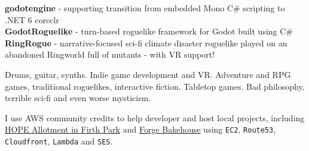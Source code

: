 \documentclass[9pt]{developercv} %
\begin{document}

\begin{minipage}[t]{0.4\textwidth}
	\vspace{-\baselineskip} %

	
	\textbf{godotengine} - supporting transition from embedded Mono C\# scripting to .NET 6 coreclr\\
	\textbf{GodotRoguelike} - turn-based roguelike framework for Godot built using C\#\\
	\textbf{RingRogue} - narrative-focused sci-fi climate disaster roguelike played on an abandoned Ringworld full of mutants - with VR support!\\

\end{minipage}
\hfill
\begin{minipage}[t]{0.25\textwidth}
	\vspace{-\baselineskip} %
	
	
	Drums, guitar, synths. Indie game development and VR. Adventure and RPG games, traditional roguelikes, interactive fiction. Tabletop games. Bad philosophy, terrible sci-fi and even worse mysticism.
\end{minipage}
\hfill
\begin{minipage}[t]{0.25\textwidth}
	\vspace{-\baselineskip} %
	
	
	I use AWS community credits to help developer and host local projects, including \href{https://hopeallotment.org.uk/}{HOPE Allotment in Firth Park} and \href{https://forgebakehouse.co.uk/}{Forge Bakehouse} using \texttt{EC2}, \texttt{Route53}, \texttt{Cloudfront}, \texttt{Lambda} and \texttt{SES}.
\end{minipage}

\end{document}
